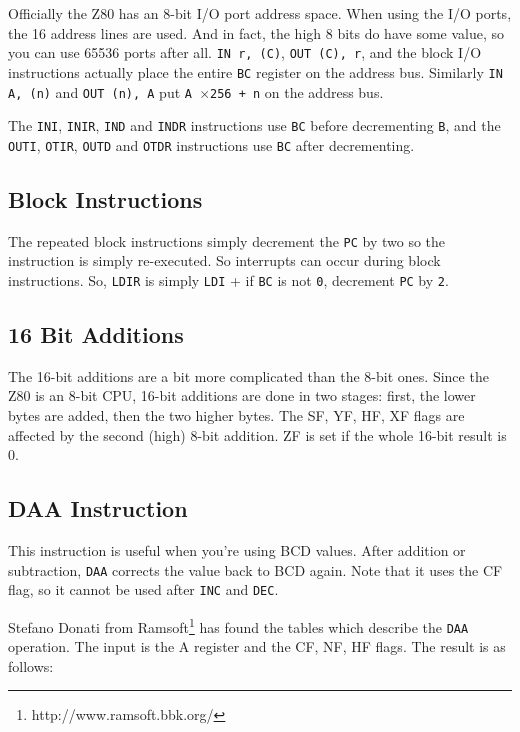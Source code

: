 Officially the Z80 has an 8-bit I/O port address space. When using the I/O ports, the 16 address lines are used. And in fact, the high 8 bits do have some value, so you can use 65536 ports after all. {\tt IN r, (C)}, {\tt OUT (C), r}, and the block I/O instructions actually place the entire {\tt BC} register on the address bus. Similarly {\tt IN A, (n)} and {\tt OUT (n), A} put {\tt A $\times$256 + n} on the address bus.

The {\tt INI}, {\tt INIR}, {\tt IND} and {\tt INDR} instructions use {\tt BC} before decrementing {\tt B}, and the {\tt OUTI}, {\tt OTIR}, {\tt OUTD} and {\tt OTDR} instructions use {\tt BC} after decrementing.


\subsection{Block Instructions}

The repeated block instructions simply decrement the {\tt PC} by two so the instruction is simply re-executed. So interrupts can occur during block instructions. So, {\tt LDIR} is simply {\tt LDI} + if {\tt BC} is not {\tt 0}, decrement {\tt PC} by {\tt 2}.


\subsection{16 Bit Additions}

The 16-bit additions are a bit more complicated than the 8-bit ones. Since the Z80 is an 8-bit CPU, 16-bit additions are done in two stages: first, the lower bytes are added, then the two higher bytes. The SF, YF, HF, XF flags are affected by the second (high) 8-bit addition. ZF is set if the whole 16-bit result is 0.


\subsection{DAA Instruction}
\label{z80_undocumented_instruction_daa}

This instruction is useful when you're using BCD values. After addition or subtraction, {\tt DAA} corrects the value back to BCD again.  Note that it uses the CF flag, so it cannot be used after {\tt INC} and {\tt DEC}.

Stefano Donati from Ramsoft\footnote{http://www.ramsoft.bbk.org/} has found the tables which describe the {\tt DAA} operation. The input is the A register and the CF, NF, HF flags. The result is as follows:

